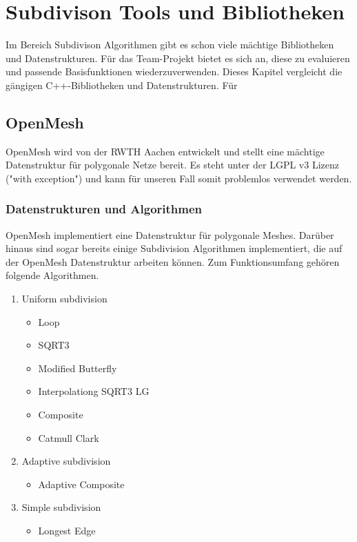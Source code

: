 \chapter{Subdivison Tools und Bibliotheken}

Im Bereich Subdivison Algorithmen gibt es schon viele mächtige Bibliotheken und Datenstrukturen.
Für das Team-Projekt bietet es sich an, diese zu evaluieren und passende Basisfunktionen wiederzuverwenden.
Dieses Kapitel vergleicht die gängigen C++-Bibliotheken und Datenstrukturen. Für


\section{OpenMesh}

OpenMesh wird von der \acs{RWTH} Aachen entwickelt und stellt eine mächtige Datenstruktur für polygonale Netze bereit.
Es steht unter der \acs{LGPL} v3 Lizenz ("with exception") und kann für unseren Fall somit problemlos verwendet werden.

\subsection{Datenstrukturen und Algorithmen}

OpenMesh implementiert eine Datenstruktur für polygonale Meshes. Darüber hinaus sind sogar bereits einige Subdivision Algorithmen implementiert, die auf der OpenMesh Datenstruktur arbeiten können. Zum Funktionsumfang gehören folgende Algorithmen.
\begin{enumerate}
\item Uniform subdivision
\begin{itemize}
	\item Loop
	\item SQRT3
	\item Modified Butterfly
	\item Interpolationg SQRT3 LG
	\item Composite
	\item Catmull Clark
\end{itemize}
\item Adaptive subdivision
\begin{itemize}
	\item Adaptive Composite
\end{itemize}
\item Simple subdivision
\begin{itemize}
	\item Longest Edge
\end{itemize}
\end{enumerate}

